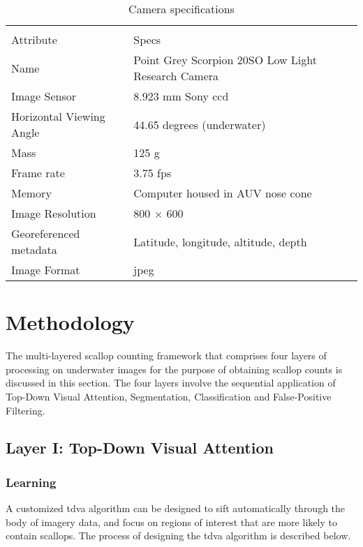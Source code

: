 %                                                      
\begin{table}                                                     
\centering
\begin{tabularx}{\textwidth}{XX}
\toprule[1pt]\\[-6pt]
Attribute	&Specs\\[2pt]\midrule
Name	&Point Grey Scorpion 20SO Low Light Research Camera\\
Image Sensor	&8.923 mm Sony ccd\\
Horizontal Viewing Angle	&44.65 degrees (underwater)\\
Mass	&125 g\\
Frame rate	&3.75 fps\\
Memory	&Computer housed in AUV nose cone\\
Image Resolution	&800 $\times$ 600\\
Georeferenced metadata	&Latitude, longitude, altitude, depth\\
Image Format	&jpeg\\[2pt]\bottomrule[1pt]
\end{tabularx}
\caption{Camera specifications\label{tab:camera_specs}}
\end{table}


\section{Methodology}

The multi-layered scallop counting framework that comprises four layers of processing on underwater images for the purpose of obtaining scallop counts is discussed in this section. 
The four layers involve the sequential application of Top-Down Visual Attention, Segmentation, Classification and False-Positive Filtering.

\subsection{Layer I: Top-Down Visual Attention} \label{subsec:TDVA}

\subsubsection{Learning}

A customized \gls{tdva} algorithm can be designed 
to sift automatically through the body of imagery data, and focus on
regions of interest that are more likely to contain scallops.
The process of designing the \gls{tdva} algorithm is described below.

